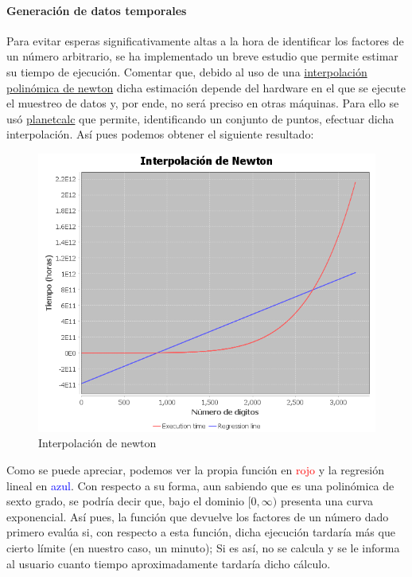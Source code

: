 \paragraph{Generación de datos temporales}
Para evitar esperas significativamente altas a la hora de identificar los factores de un número arbitrario, se ha implementado un breve estudio que permite estimar su tiempo de ejecución. Comentar que, debido al uso de una \href{https://en.wikipedia.org/wiki/Newton_polynomial}{interpolación polinómica de newton} dicha estimación depende del hardware en el que se ejecute el muestreo de datos y, por ende, no será preciso en otras máquinas. Para ello se usó \href{https://planetcalc.com/9023/?xy=5%2010%0A7%2023%0A8%2061%0A10%20165%0A11%20428%0A14%2016596%0A15%2037864&interpolate=10%2020%2030%2040}{planetcalc} que permite, identificando un conjunto de puntos, efectuar dicha interpolación. Así pues podemos obtener el siguiente resultado:
\begin{figure}[!h]
    \centering
    \includegraphics[width=\linewidth]{MVC/Controller/img/newton interpolation.png}
    \caption{Interpolación de newton}
    \label{fig:newtoninterpolation}
\end{figure}

Como se puede apreciar, podemos ver la propia función en \textcolor{red}{rojo} y la regresión lineal en \textcolor{blue}{azul}. Con respecto a su forma, aun sabiendo que es una polinómica de sexto grado, se podría decir que, bajo el dominio $[0, \infty)$ presenta una curva exponencial. Así pues, la función que devuelve los factores de un número dado primero evalúa si, con respecto a esta función, dicha ejecución tardaría más que cierto límite (en nuestro caso, un minuto); Si es así, no se calcula y se le informa al usuario cuanto tiempo aproximadamente tardaría dicho cálculo.\bigskip

